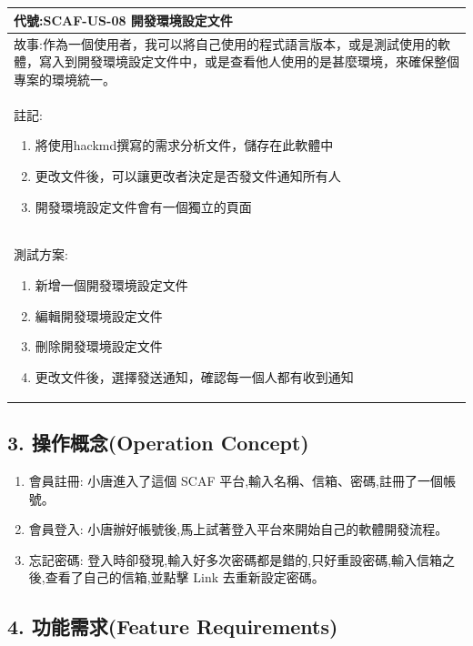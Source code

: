 \documentclass{report}
\begin{document}
\subsection*{}
\fontsize{12}{20}\selectfont
\begin{tabularx}{\textwidth}{|X|}
  \hline
  代號:SCAF-US-08 開發環境設定文件 \\
  \hline
  故事:作為一個使用者，我可以將自己使用的程式語言版本，或是測試使用的軟體，寫入到開發環境設定文件中，或是查看他人使用的是甚麼環境，來確保整個專案的環境統一。 \\
  \hline
  註記:
  \begin{enumerate}
    \item 將使用hackmd撰寫的需求分析文件，儲存在此軟體中
    \item 更改文件後，可以讓更改者決定是否發文件通知所有人
    \item 開發環境設定文件會有一個獨立的頁面
  \end{enumerate} \\
  \hline
  測試方案:
  \begin{enumerate}
    \item 新增一個開發環境設定文件
    \item 編輯開發環境設定文件
    \item 刪除開發環境設定文件
    \item 更改文件後，選擇發送通知，確認每一個人都有收到通知
  \end{enumerate} \\
  \hline
\end{tabularx}


\subsection*{3. 操作概念(Operation
 Concept)}

\begin{enumerate}[label=(\Alph*)]
  \item 會員註冊: 小唐進入了這個 SCAF 平台,輸入名稱、信箱、密碼,註冊了一個帳號。
  \item 會員登入: 小唐辦好帳號後,馬上試著登入平台來開始自己的軟體開發流程。
  \item 忘記密碼: 登入時卻發現,輸入好多次密碼都是錯的,只好重設密碼,輸入信箱之後,查看了自己的信箱,並點擊 Link 去重新設定密碼。
\end{enumerate}

\subsection*{4. 功能需求(Feature Requirements)}
\end{document}
